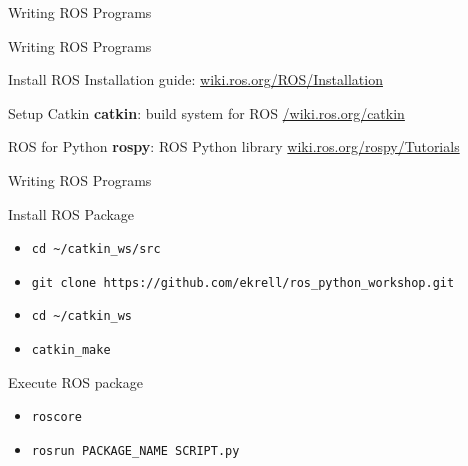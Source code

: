 \documentclass[9pt]{beamer}
\begin{document}
\begin{section}{Writing ROS Programs}
    \begin{frame}{Writing ROS Programs}
        \begin{block}{Install ROS}
            Installation guide:
            \url{wiki.ros.org/ROS/Installation}
        \end{block}   
        \begin{block}{Setup Catkin}
            \textbf{catkin}: build system for ROS
            \url{/wiki.ros.org/catkin}
        \end{block}           
        \begin{block}{ROS for Python}
            \textbf{rospy}: ROS Python library
            \url{wiki.ros.org/rospy/Tutorials}
        \end{block}
    \end{frame}
    \begin{frame}{Writing ROS Programs}
        \begin{block}{Install ROS Package}
            \begin{itemize}
                \item[] \lstinline{cd ~/catkin_ws/src}
                \item[] \lstinline{git clone https://github.com/ekrell/ros_python_workshop.git}
                \item[] \lstinline{cd ~/catkin_ws}
                \item[] \lstinline{catkin_make}
            \end{itemize}
        \end{block}
        \begin{block}{Execute ROS package}
            \begin{itemize}
                \item[] \lstinline{roscore}
                \item[] \lstinline{rosrun PACKAGE_NAME SCRIPT.py}
            \end{itemize}
        \end{block}
    \end{frame}
\end{section}
\end{document}
